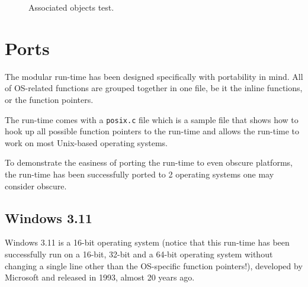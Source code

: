 \begin{figure}[H]
  \centering{}
  \caption{Associated objects test.}
  \label{fig:ao_test}
\end{figure}



\section{Ports}

The modular run-time has been designed specifically with portability in mind. All of OS-related functions are grouped together in one file, be it the inline functions, or the function pointers.

The run-time comes with a \verb=posix.c= file which is a sample file that shows how to hook up all possible function pointers to the run-time and allows the run-time to work on most Unix-based operating systems.

To demonstrate the easiness of porting the run-time to even obscure platforms, the run-time has been successfully ported to 2 operating systems one may consider obscure.

\subsection{Windows 3.11}

Windows 3.11 is a 16-bit operating system (notice that this run-time has been successfully run on a 16-bit, 32-bit and a 64-bit operating system without changing a single line other than the OS-specific function pointers!), developed by Microsoft and released in 1993, almost 20 years ago.

